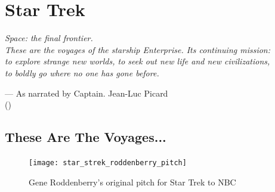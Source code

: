 
\chapter{Star Trek}\label{ch:star trek}

\begin{center}
\textit{Space: the final frontier. \\ These are the voyages of the starship Enterprise. Its continuing mission: \\ to explore strange new worlds, to seek out new life and new civilizations, \\ to boldly go where no one has gone before.}
\end{center}
\begin{flushright}
--- As narrated by Captain. Jean-Luc Picard \\
(\citealt{day_boldly_2005})
\end{flushright}


\section{These Are The Voyages...}

\begin{figure}
\texttt{[image: star\_strek\_roddenberry\_pitch]}
\caption{Gene Roddenberry's original pitch for Star Trek to NBC}
\end{figure}

